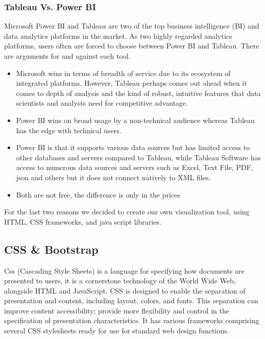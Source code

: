 \subsubsection{Tableau Vs. Power BI}
Microsoft Power BI and Tableau are two of the top business intelligence (BI) and data analytics platforms in the market. As two highly regarded analytics platforms, users often are forced to choose between Power BI and Tableau. There are arguments for and against each tool\cite{robbPowerBIVs2022}.
\begin{itemize}
    \renewcommand{\labelitemi}{$\bullet$}
    \item Microsoft wins in terms of breadth of service due to its ecosystem of integrated platforms. However, Tableau perhaps comes out ahead when it comes to depth of analysis and the kind of robust, intuitive features that data scientists and analysts need for competitive advantage.
    \item Power BI wins on broad usage by a non-technical audience whereas Tableau has the edge with technical users.
    \item Power BI is that it supports various data sources but has limited access to other databases and servers compared to Tableau, while Tableau Software has access to numerous data sources and servers such as Excel, Text File, PDF, \gls{json} and others but it does not connect natively to XML files.
    \item Both are not free, the difference is only in the prices
\end{itemize}
\bigbreak
For the last two reasons we decided to create our own visualization tool, using HTML, CSS frameworks, and java script libraries.
\newpage
\subsection{CSS \& Bootstrap}
Css (Cascading Style Sheets) is a language for specifying how documents are presented to users\cite{WhatCSSLearn}, it is a cornerstone technology of the World Wide Web, alongside HTML and JavaScript. CSS is designed to enable the separation of presentation and content, including layout, colors, and fonts. This separation can improve content accessibility; provide more flexibility and control in the specification of presentation characteristics\cite{CSS2022}. It has various frameworks comprising several CSS stylesheets ready for use  for standard web design functions.

